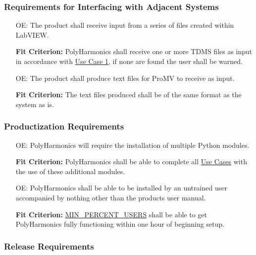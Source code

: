 \documentclass[12pt]{article}
\newcounter{oaenum}
\newcommand{\progname}{PolyHarmonics}
\begin{document}
\subsubsection{Requirements for Interfacing with Adjacent Systems}

\noindent \begin{itemize}
\item[OE\refstepcounter{oaenum}\theoaenum\label{NF_AS1}:] The product shall
  receive input from a series of files created within LabVIEW.

  \textbf{Fit Criterion:} \progname{} shall receive one or more TDMS files as 
input in accordance with \hyperref[UseCase]{Use Case 1}, if none are found
 the user shall be warned.

\item[OE\refstepcounter{oaenum}\theoaenum\label{NF_AS2}:] The product shall
  produce text files for ProMV to receive as input.

  \textbf{Fit Criterion:} The text files produced shall be of the same format as 
the system as is.
\end{itemize}


\subsubsection{Productization Requirements}

\noindent \begin{itemize}
\item[OE\refstepcounter{oaenum}\theoaenum\label{NF_PR1}:] \progname{} will
  require the installation of multiple Python modules.

  \textbf{Fit Criterion:} \progname{} shall be able to complete all
\hyperref[UseCase]{Use Cases} with the use of these additional modules.


\item[OE\refstepcounter{oaenum}\theoaenum\label{NF_PR2}:] \progname{} shall be
  able to be installed by an untrained user accompanied by nothing other than
  the products user manual.

  \textbf{Fit Criterion:} \hyperref[AppendA]{MIN\_PERCENT\_USERS} shall be able
  to get \progname{} fully functioning within one hour of beginning setup.
\end{itemize}

\subsubsection{Release Requirements}
\end{document}
